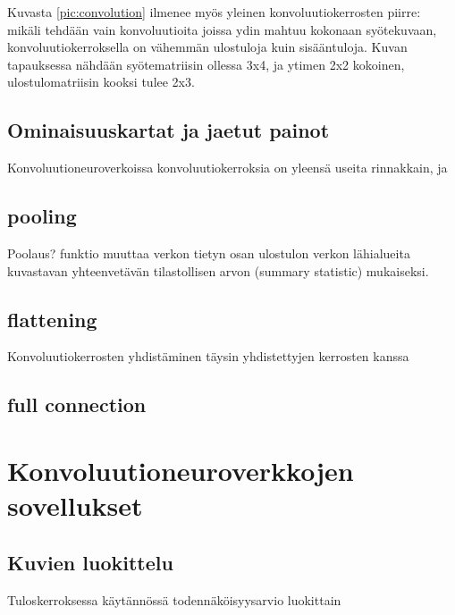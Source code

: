 \documentclass[finnish]{tktltiki2}
\theoremstyle{definition}
\theoremstyle{remark}
\begin{document}
  Kuvasta \ref{pic:convolution} ilmenee myös yleinen konvoluutiokerrosten piirre: mikäli tehdään vain konvoluutioita joissa ydin mahtuu kokonaan syötekuvaan, konvoluutiokerroksella on vähemmän ulostuloja kuin sisääntuloja. Kuvan tapauksessa nähdään syötematriisin ollessa 3x4, ja ytimen 2x2 kokoinen, ulostulomatriisin kooksi tulee 2x3.

  \subsection{Ominaisuuskartat ja jaetut painot}

  Konvoluutioneuroverkoissa konvoluutiokerroksia on yleensä useita rinnakkain, ja 

  \subsection{pooling}
  Poolaus? funktio muuttaa verkon tietyn osan ulostulon verkon lähialueita kuvastavan yhteenvetävän tilastollisen arvon (summary statistic) mukaiseksi.
  \subsection{flattening}
  Konvoluutiokerrosten yhdistäminen täysin yhdistettyjen kerrosten kanssa

  \subsection{full connection}

  \section{Konvoluutioneuroverkkojen sovellukset}
  \subsection{Kuvien luokittelu}
  Tuloskerroksessa käytännössä todennäköisyysarvio luokittain












  \nocite{*}
  
  





  
\end{document}
